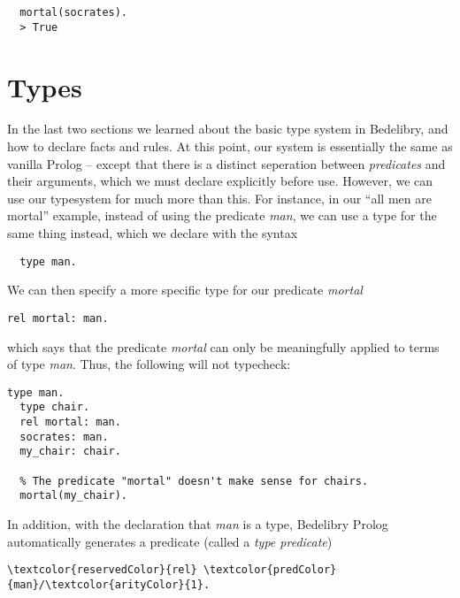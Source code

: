 \documentclass{book}
\begin{document}
\begin{verbatim}
  mortal(socrates).
  > True
\end{verbatim}

\section{Types}

In the last two sections we learned about the basic type system in Bedelibry, and how to declare facts and rules. At this point, our system is essentially the same as vanilla Prolog -- except that there is a distinct seperation between \textit{predicates} and their arguments, which we must declare explicitly before use. However, we can use our typesystem for much more than this. For instance, in our ``all men are mortal'' example, instead of using the predicate \textit{man}, we can use a type for the same thing instead, which we declare with the syntax

\begin{verbatim}
  type man.
\end{verbatim}

We can then specify a more specific type for our predicate \textit{mortal}

\begin{Verbatim}[commandchars=\\\{\}]
  rel mortal: man.
\end{Verbatim}

which says that the predicate \textit{mortal} can only be meaningfully applied to terms of type \textit{man}. Thus, the following will not typecheck:

\begin{Verbatim}[commandchars=\\\{\}]
  type man.
  type chair.
  rel mortal: man.
  socrates: man.
  my_chair: chair.

  % The predicate "mortal" doesn't make sense for chairs.
  mortal(my_chair).
\end{Verbatim}

In addition, with the declaration that \textit{man} is a type, Bedelibry Prolog automatically generates a predicate (called a \textit{type predicate})

\begin{Verbatim}[commandchars=\\\{\}]
  \textcolor{reservedColor}{rel} \textcolor{predColor}{man}/\textcolor{arityColor}{1}.
\end{Verbatim}
\end{document}
